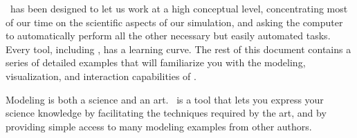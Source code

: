 \ejs\ has been designed to let us work at a high
conceptual level, concentrating most of our time on the scientific aspects of our simulation, and asking the computer
to automatically perform all the other necessary but easily automated tasks.
Every tool, including \Ejs, has a learning curve. The rest of this document contains a series of detailed examples that will familiarize you with the modeling, visualization, and interaction capabilities of \ejs. 

Modeling is both a science and an art. \Ejs\ is a tool that lets you express your science knowledge by facilitating the techniques required by the art, and by providing simple access to many modeling examples from other authors.






